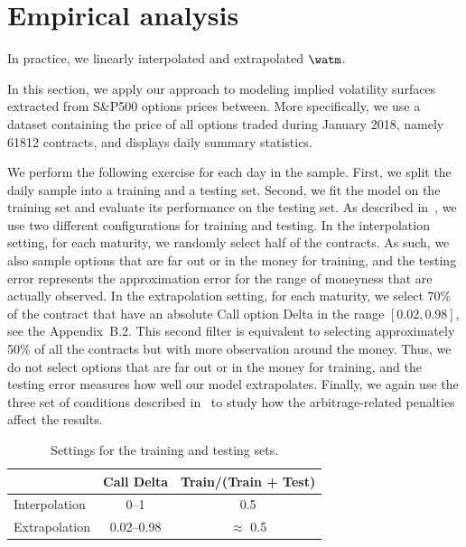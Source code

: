 \section{Empirical analysis}\label{sec:emp}

In practice, we linearly interpolated and extrapolated $\watm$. 



In this section, we apply our approach to modeling implied volatility surfaces extracted from S\&P500 options prices between.
More specifically, we use a dataset containing the price of all options traded during January 2018, namely 61812 contracts, and  displays daily summary statistics.

We perform the following exercise for each day in the sample.
First, we split the daily sample into a training and a testing set.
Second, we fit the model on the training set and evaluate its performance on the testing set.
As described in~, we use two different configurations for training and testing.
In the interpolation setting, for each maturity, we randomly select half of the contracts.
As such, we also sample options that are far out or in the money for training, and the testing error represents the approximation error for the range of moneyness that are actually observed.
In the extrapolation setting, for each maturity, we select 70\% of the contract that have an absolute Call option Delta in the range $[0.02,0.98]$, see the Appendix~B.2.
This second filter is equivalent to selecting approximately 50\% of all the contracts but with more observation around the money.
Thus, we do not select options that are far out or in the money for training, and the testing error measures how well our model extrapolates.
Finally, we again use the three set of conditions described in~ to study how the arbitrage-related penalties affect the results.

\begin{table}
\caption{Settings for the training and testing sets.\label{tab:intraextra}}
\centering
\begin{tabular}{ l c c   }
  \hline
    & Call Delta & Train/(Train + Test) \\
\hline
   Interpolation & 0--1 & 0.5 \\
\hline
   Extrapolation & 0.02--0.98 & $\approx$ 0.5 \\
\hline
\end{tabular}
\end{table}

